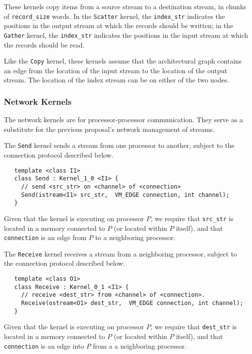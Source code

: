 These kernels copy items from a source stream to a destination stream,
in chunks of {\tt record\_size} words.  In the {\tt Scatter} kernel,
the {\tt index\_str} indicates the positions in the output stream at
which the records should be written; in the {\tt Gather} kernel, the
{\tt index\_str} indicates the positions in the input stream at which
the records should be read.

Like the {\tt Copy} kernel, these kernels assume that the
architectural graph contains an edge from the location of the input
stream to the location of the output stream.  The location of the
index stream can be on either of the two nodes.

\subsubsection*{Network Kernels}

The network kernels are for processor-processor communication.  They
serve as a substitute for the previous proposal's network management
of streams.

  The {\tt Send} kernel sends a stream from one processor to another,
subject to the connection protocol described below.
\begin{verbatim}
   template <class I1>
   class Send : Kernel_1_0 <I1> {
     // send <src_str> on <channel> of <connection>
     Send(istream<I1> src_str,  VM_EDGE connection, int channel);
   }
\end{verbatim}

Given that the kernel is executing on processor $P$, we require that
{\tt src\_str} is located in a memory connected to $P$ (or located
within $P$ itself), and that {\tt connection} is an edge from $P$ to a
neighboring processor.

  The {\tt Receive} kernel receives a stream from a neighboring
processor, subject to the connection protocol described below.
\begin{verbatim}
   template <class O1>
   class Receive : Kernel_0_1 <I1> {
     // receive <dest_str> from <channel> of <connection>.
     Receive(ostream<O1> dest_str,  VM_EDGE connection, int channel);
   }  
\end{verbatim}

Given that the kernel is executing on processor $P$, we require that
{\tt dest\_str} is located in a memory connected to $P$ (or located
within $P$ itself), and that {\tt connection} is an edge into $P$ from
a a neighboring processor.

